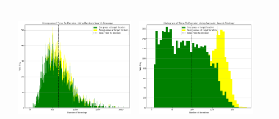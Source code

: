 \begin{landscape}
\begin{table}[h!]
\begin{tabular}{ | c | c | c | c | c |}
\begin{minipage}[c][58mm][c]{49mm}
    \end{minipage}
    &
    \begin{minipage}[c][58mm][c]{49mm}
      \includegraphics[width=49mm, height=52mm]{Chapters/MultiAgentTargetDetection/Figs/Histograms/VaryingPrior/Uniform/UniformRandomHistogram.png}
    \end{minipage}
    &
    \begin{minipage}[c][58mm][c]{49mm}
      \includegraphics[width=49mm, height=52mm]{Chapters/MultiAgentTargetDetection/Figs/Histograms/VaryingPrior/Uniform/UniformSaccadicHistogram.png}
    \end{minipage}
    \\
    \hline
   
  \end{tabular}
  \label{table:HistVaryingPriorDist}
\end{table}

\break



\end{landscape}

